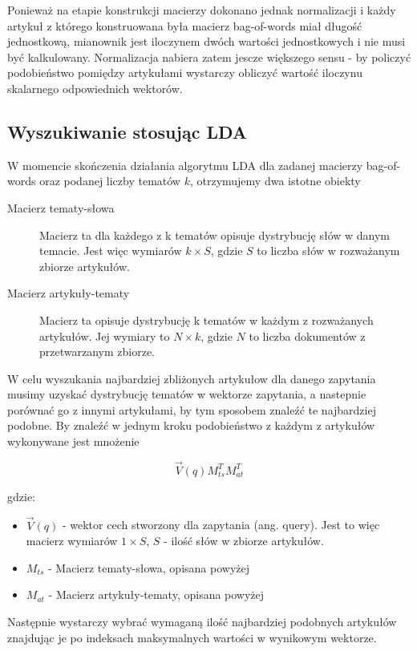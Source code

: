 Ponieważ na etapie konstrukcji macierzy dokonano jednak normalizacji i każdy artykuł z którego konstruowana była macierz bag-of-words miał długość jednostkową, mianownik jest iloczynem dwóch wartości jednostkowych i nie musi być kalkulowany. Normalizacja nabiera zatem jescze większego sensu - by policzyć podobieństwo pomiędzy artykułami wystarczy obliczyć wartość iloczynu skalarnego odpowiednich wektorów.

\subsection{Wyszukiwanie stosując LDA}

W momencie skończenia działania algorytmu LDA dla zadanej macierzy bag-of-words oraz podanej liczby tematów $k$, otrzymujemy dwa istotne obiekty
\begin{description}
\item[Macierz tematy-słowa]
Macierz ta dla każdego z k tematów opisuje dystrybucję słów w danym temacie. Jest więc wymiarów $k \times S$, gdzie $S$ to liczba słów w rozważanym zbiorze artykułów.
\item[Macierz artykuły-tematy]
Macierz ta opisuje dystrybucję k tematów w każdym z rozważanych artykułów. Jej wymiary to $ N \times k$, gdzie $N$ to liczba dokumentów z przetwarzanym zbiorze. 
\end{description}

W celu wyszukania najbardziej zbliżonych artykułow dla danego zapytania musimy uzyskać dystrybucję tematów w wektorze zapytania, a nastepnie porównać go z innymi artykułami, by tym sposobem znaleźć te najbardziej podobne. By znaleźć w jednym kroku podobieństwo z każdym z artykułów wykonywane jest mnożenie

$$\vec{V}(q) M_{ts} ^T M_{at} ^T$$

gdzie:

\begin{itemize}
\item $\vec{V}(q)$ - wektor cech stworzony dla zapytania (ang. query). Jest to więc macierz wymiarów $1 \times S$, $S$ - ilość słów w zbiorze artykułów.
\item $M_{ts}$ - Macierz tematy-słowa, opisana powyżej
\item $M_{at}$ - Macierz artykuły-tematy, opisana powyżej
\end{itemize}

Następnie wystarczy wybrać wymaganą ilość najbardziej podobnych artykułów znajdując je po indeksach maksymalnych wartości w wynikowym wektorze.





